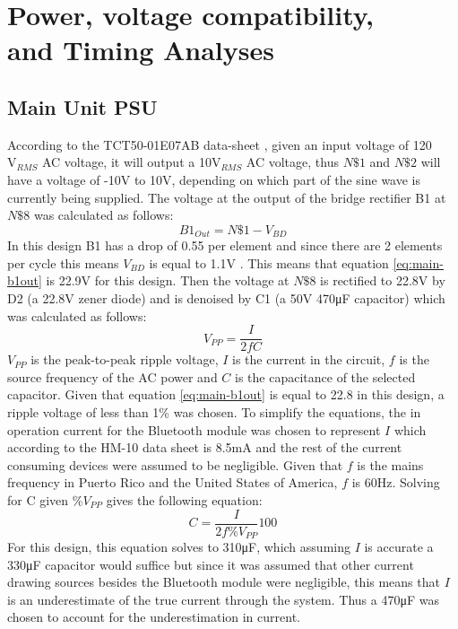 \section{Power, voltage compatibility,\\ and Timing Analyses}
\subsection{Main Unit PSU}
According to the TCT50-01E07AB data-sheet \cite{TCT5001E07AB}, given an input voltage of 120$\si{\V}_{RMS}$ AC voltage, it will output a 10$\si{\V}_{RMS}$ AC voltage, thus $N\$1$ and $N\$2$ will have a voltage of -10\si{\V} to 10\si{\V}, depending on which part of the sine wave is currently being supplied. The voltage at the output of the bridge rectifier B1 at $N\$8$ was calculated as follows:
\begin{equation}
  B1_{Out} = N\$1 - V_{BD}
  \label{eq:main-b1out}
\end{equation}
In this design B1 has a drop of 0.55 per element and since there are 2 elements per cycle this means $V_{BD}$ is equal to 1.1\si{V} \cite{KMB23S}. This means that equation \ref{eq:main-b1out} is 22.9\si{\V} for this design. Then the voltage at $N\$8$ is rectified to 22.8\si{V} by D2 (a 22.8\si{\V} zener diode) and is denoised by C1 (a 50\si{\V} 470\si{\micro\farad} capacitor) which was calculated as follows:
\begin{equation}
  V_{PP} = \frac{I}{2fC}
  \label{eq:main-filter-cap}
\end{equation}
$V_{PP}$ is the peak-to-peak ripple voltage, $I$ is the current in the circuit, $f$ is the source frequency of the AC power and $C$ is the capacitance of the selected capacitor. Given that equation \ref{eq:main-b1out} is equal to 22.8 in this design, a ripple voltage of less than 1\% was chosen. To simplify the equations, the in operation current for the Bluetooth module was chosen to represent $I$ which according to the HM-10 data sheet is 8.5\si{\mA} and the rest of the current consuming devices were assumed to be negligible. Given that $f$ is the mains frequency in Puerto Rico and the United States of America, $f$ is 60\si{\Hz}. Solving for C given $\%V_{PP}$ gives the following equation:
\begin{equation}
  C = \frac{I}{2f\%V_{PP}}100
  \label{eq:cap-given-percent-vpp}
\end{equation}
For this design, this equation solves to 310\si{\micro\farad}, which assuming $I$ is accurate a 330\si{\micro\farad} capacitor would suffice but since it was assumed that other current drawing sources besides the Bluetooth module were negligible, this means that $I$ is an underestimate of the true current through the system. Thus a 470\si{\micro\farad} was chosen to account for the underestimation in current.\\\\
